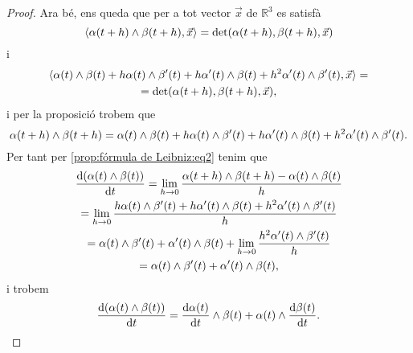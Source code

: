 \documentclass[../Apunts.tex]{subfiles}
\begin{document}
\begin{proof}
		Ara bé, ens queda que per a tot vector \(\vec{x}\) de \(\mathbb{R}^{3}\) es satisfà
		\[\prodesc{\alpha(t+h)\prodvec\beta(t+h)}{\vec{x}}=\det(\alpha(t+h),\beta(t+h),\vec{x})\]
		i
		\begin{multline*}
			\prodesc{\alpha(t)\prodvec\beta(t)+h\alpha(t)\prodvec\beta'(t)+h\alpha'(t)\prodvec\beta(t)+h^{2}\alpha'(t)\prodvec \beta'(t)}{\vec{x}}=\\=\det(\alpha(t+h),\beta(t+h),\vec{x}),
		\end{multline*}
		i per la proposició  trobem que
		\[\alpha(t+h)\mathbin{\wedge}\beta(t+h)=\alpha(t)\mathbin{\wedge}\beta(t)+h\alpha(t)\mathbin{\wedge}\beta'(t)+h\alpha'(t)\mathbin{\wedge}\beta(t)+h^{2}\alpha'(t)\mathbin{\wedge} \beta'(t).\]
		Per tant per \eqref{prop:fórmula de Leibniz:eq2} tenim que
		\begin{multline*}
			\frac{\mathop{}\!\mathrm{d}(\alpha(t)\mathbin{\wedge}\beta(t))}{\mathop{}\!\mathrm{d} t}=\lim_{h\to0}\frac{\alpha(t+h)\mathbin{\wedge}\beta(t+h)-\alpha(t)\mathbin{\wedge}\beta(t)}{h}\\
			=\lim_{h\to0}\frac{h\alpha(t)\mathbin{\wedge}\beta'(t)+h\alpha'(t)\mathbin{\wedge}\beta(t)+h^{2}\alpha'(t)\mathbin{\wedge} \beta'(t)}{h}\\
			=\alpha(t)\mathbin{\wedge}\beta'(t)+\alpha'(t)\mathbin{\wedge}\beta(t)+\lim_{h\to0}\frac{h^{2}\alpha'(t)\mathbin{\wedge} \beta'(t)}{h}\\
			=\alpha(t)\mathbin{\wedge}\beta'(t)+\alpha'(t)\mathbin{\wedge}\beta(t),
		\end{multline*}
		i trobem
		\[\frac{\mathop{}\!\mathrm{d}(\alpha(t)\mathbin{\wedge}\beta(t))}{\mathop{}\!\mathrm{d} t}=\frac{\mathop{}\!\mathrm{d}\alpha(t)}{\mathop{}\!\mathrm{d} t}\mathbin{\wedge}\beta(t)+\alpha(t)\mathbin{\wedge}\frac{\mathop{}\!\mathrm{d}\beta(t)}{\mathop{}\!\mathrm{d} t}.\qedhere\]
	\end{proof}
\end{document}
